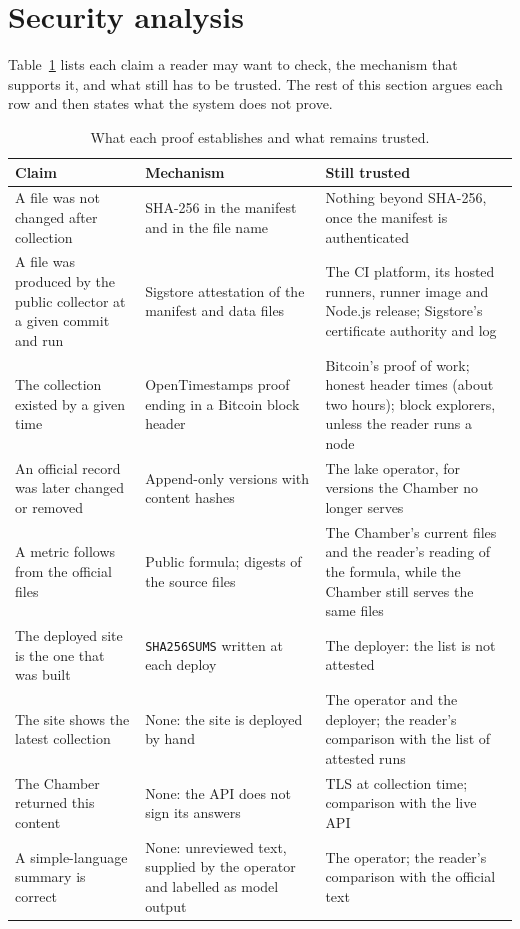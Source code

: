\section{Security analysis}
\label{sec:security}

Table~\ref{tab:claims} lists each claim a reader may want to check, the mechanism that supports it, and what still has to be trusted. The rest of this section argues each row and then states what the system does not prove.

\begin{table}[t]
\centering
\small
\begin{tabularx}{\textwidth}{@{}>{\raggedright\arraybackslash}p{3.6cm}>{\raggedright\arraybackslash}p{3.9cm}>{\raggedright\arraybackslash}X@{}}
\toprule
Claim & Mechanism & Still trusted \\
\midrule
A file was not changed after collection & SHA-256 in the manifest and in the file name & Nothing beyond SHA-256, once the manifest is authenticated \\
\addlinespace[3pt]
A file was produced by the public collector at a given commit and run & Sigstore attestation of the manifest and data files & The CI platform, its hosted runners, runner image and Node.js release; Sigstore's certificate authority and log \\
\addlinespace[3pt]
The collection existed by a given time & OpenTimestamps proof ending in a Bitcoin block header & Bitcoin's proof of work; honest header times (about two hours); block explorers, unless the reader runs a node \\
\addlinespace[3pt]
An official record was later changed or removed & Append-only versions with content hashes & The lake operator, for versions the Chamber no longer serves \\
\addlinespace[3pt]
A metric follows from the official files & Public formula; digests of the source files & The Chamber's current files and the reader's reading of the formula, while the Chamber still serves the same files \\
\addlinespace[3pt]
The deployed site is the one that was built & \texttt{SHA256SUMS} written at each deploy & The deployer: the list is not attested \\
\addlinespace[3pt]
The site shows the latest collection & None: the site is deployed by hand & The operator and the deployer; the reader's comparison with the list of attested runs \\
\addlinespace[3pt]
The Chamber returned this content & None: the API does not sign its answers & TLS at collection time; comparison with the live API \\
\addlinespace[3pt]
A simple-language summary is correct & None: unreviewed text, supplied by the operator and labelled as model output & The operator; the reader's comparison with the official text \\

\bottomrule
\end{tabularx}
\caption{What each proof establishes and what remains trusted.}
\label{tab:claims}
\end{table}

